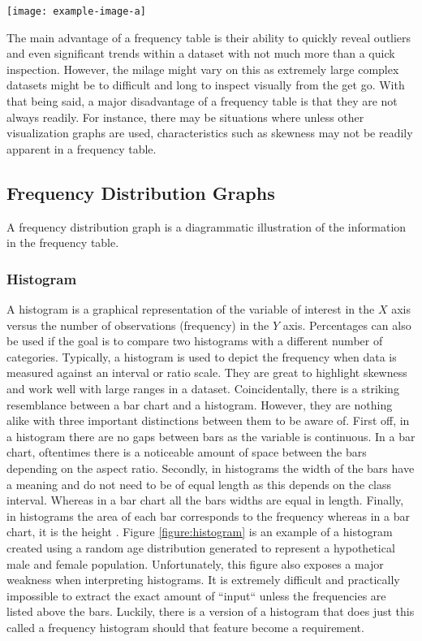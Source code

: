 \texttt{[image: example-image-a]} 

The main advantage of a frequency table is their ability to quickly reveal 
outliers and even significant trends within a dataset with not much more than 
a quick inspection. However, the milage might vary on this as extremely 
large complex datasets might be to difficult and long to inspect visually from the
get go. With that being said, a major disadvantage of a frequency table is that they are not always 
readily. For instance, there may be situations where unless other visualization 
graphs are used, characteristics such as skewness may not be readily apparent in 
a frequency table.   

\subsection{Frequency Distribution Graphs}
A frequency distribution graph is a diagrammatic illustration of the information 
in the frequency table. 

\subsubsection{Histogram}
A histogram is a graphical representation of the variable of interest in the 
$X$ axis versus the number of observations (frequency) in the $Y$ axis. Percentages 
can also be used if the goal is to compare two histograms with a different number of 
categories. Typically, a histogram is used to depict the frequency when data is 
measured against an interval or ratio scale. They are great to highlight skewness
and work well with large ranges in a dataset. Coincidentally, there is a striking
resemblance between a bar chart and a histogram. However, they are nothing alike 
with three important distinctions between them to be aware of. First off, in a histogram there 
are no gaps between bars as the variable is continuous. In a bar chart, oftentimes 
there is a noticeable amount of space between the bars depending on the aspect
ratio. Secondly, in histograms the width of the bars have a meaning and do not 
need to be of equal length as this depends on the class interval. Whereas in a bar 
chart all the bars widths are equal in length. Finally, in histograms the area 
of each bar corresponds to the frequency whereas in a bar chart, it is the height \cite{c10}. 
Figure \ref{figure:histogram} is an example of a histogram created using a random age 
distribution generated to represent a hypothetical male and female population. 
Unfortunately, this figure also exposes a major weakness when interpreting 
histograms. It is extremely difficult and practically impossible to extract the 
exact amount of ``input`` unless the frequencies are listed above the bars. Luckily,
there is a version of a histogram that does just this called a frequency histogram
should that feature become a requirement. 

